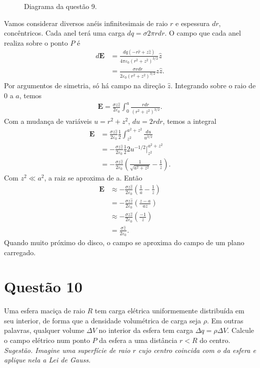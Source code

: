 \documentclass[11pt]{article}
\begin{document}
\begin{figure}[h!]
  \centering
  \caption{Diagrama da questão 9.}
  \label{fig:ex-9}
\end{figure}
Vamos considerar diversos anéis infinitesimais de raio \(r\) e espessura
\(dr\), concêntricos. Cada anel terá uma carga \(dq = \sigma2\pi rdr\). O campo que
cada anel realiza sobre o ponto \(P\) é
\begin{align*}
  d\mathbf E &= \frac{dq(-r\hat r+z\hat z)}{4\pi\varepsilon_0(r^2+z^2)^{3/2}}\hat z\\
             &= \frac{\sigma rdr}{2\varepsilon_0(r^2+z^2)^{3/2}}z\hat z. 
\end{align*}
Por argumentos de simetria, só há campo na direção \(\hat z\).
Integrando sobre o raio de \(0\) a \(a\), temos
\begin{align*}
  \mathbf E = \frac{\sigma z\hat z}{2\varepsilon_0}\int_0^a \frac{rdr}{(r^2+z^2)^{3/2}}.
\end{align*}
Com a mudança de variáveis \(u=r^2+z^2\), \(du = 2rdr\), temos a integral
\begin{align*}
  \mathbf E &= \frac{\sigma z\hat z}{2\varepsilon_0}\frac12\int_{z^2}^{a^2+z^2} \frac{du}{u^{3/2}}\\
            &= -\frac{\sigma z\hat z}{2\varepsilon_0}\frac12 2{u^{-1/2}}\big\vert_{z^2}^{a^2+z^2}\\
            &= -\frac{\sigma z\hat z}{2\varepsilon_0}\left(\frac1{\sqrt{a^2+z^2}}-\frac1z\right).
\end{align*}
Com \(z^2 \ll a^2\), a raiz se aproxima de a. Então
\begin{align*}
  \mathbf E &\approx -\frac{\sigma z\hat z}{2\varepsilon_0}\left(\frac1a-\frac1z\right)\\
            &= -\frac{\sigma z\hat z}{2\varepsilon_0}\left(\frac{z-a}{az}\right)\\
            &\approx -\frac{\sigma z\hat z}{2\varepsilon_0}\left(\frac{-1}{z}\right)\\
            &= \frac{\sigma \hat z}{2\varepsilon_0}.
\end{align*}
Quando muito próximo do disco, o campo se aproxima do campo de um plano
carregado. 
\section{Questão 10}
\label{sec:org4229593}
Uma esfera maciça de raio \(R\) tem carga elétrica uniformemente
distribuída em seu interior, de forma que a densidade volumétrica de
carga seja \(\rho\). Em outras palavras, qualquer volume \(\Delta V\) no interior da
esfera tem carga \(\Delta q=\rho\Delta V\). Calcule o campo elétrico num ponto \(P\) da
esfera a uma distância \(r<R\) do centro. \emph{Sugestão. Imagine uma}
\emph{superfície de raio \(r\) cujo centro coincida com o da esfera e aplique}
\emph{nela a Lei de Gauss.}
\end{document}
